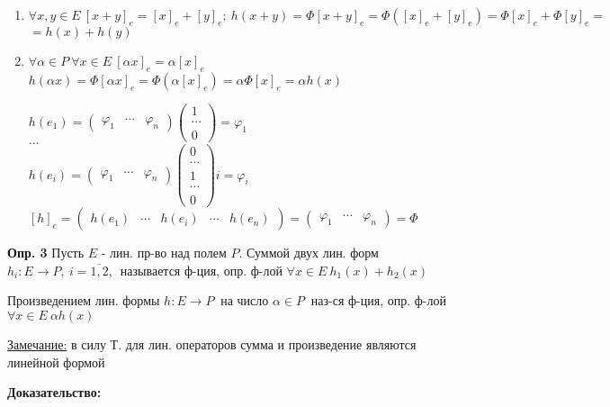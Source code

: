 \begin{enumerate}
 \item $\forall x,y \in E\ [x+y]_e = [x]_e + [y]_e;\ h(x+y) = \Phi[x+y]_e = \Phi([x]_e + [y]_e) = \Phi[x]_e + \Phi[y]_e =$\\$= h(x) + h(y)$
 \item $\forall \alpha \in P\ \forall x \in E\ [\alpha x]_e = \alpha[x]_e$\\
$h(\alpha x) = \Phi[\alpha x]_e = \Phi(\alpha [x]_e) = \alpha \Phi[x]_e = \alpha h(x)$

$h(e_1) = \begin{pmatrix} \varphi_1 & \cdots & \varphi_n \end{pmatrix} \begin{pmatrix} 1 \\ \cdots \\ 0 \end{pmatrix} = \varphi_1$\\
$\ldots$\\
$h(e_i) = \begin{pmatrix} \varphi_1 & \cdots & \varphi_n \end{pmatrix} \begin{pmatrix} 0 \\ \cdots \\ 1 \\ \cdots \\ 0 \end{pmatrix} i = \varphi_i $\\

$[h]_e = \begin{pmatrix} h(e_1) & \cdots & h(e_i) & \cdots & h(e_n) \end{pmatrix} = \begin{pmatrix} \varphi_1 & \cdots & \varphi_n \end{pmatrix} = \Phi$
\end{enumerate}

\textbf{Опр. 3} Пусть $E$ - лин. пр-во над полем $P$. Суммой двух лин. форм $h_i : E \to P,\ i=\overline{1,2},$\ называется ф-ция, опр. ф-лой $\forall x \in E\ h_1(x) + h_2(x)$

Произведением лин. формы $h : E \to P\ $ на число $\alpha \in P\ $ наз-ся ф-ция, опр. ф-лой $\forall x\in E\ \alpha h(x)$

\underline{Замечание:} в силу Т. для лин. операторов сумма и произведение являются линейной формой

\textbf{Доказательство:} %
\\

